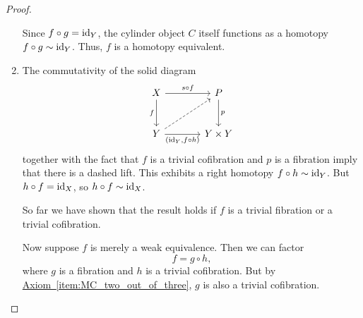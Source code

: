 \documentclass[main.tex]{subfiles}
\begin{document}
\begin{proof}
\begin{enumerate}
      Since $f \circ g = \mathrm{id}_{Y}$, the cylinder object $C$ itself functions as a homotopy $f \circ g \sim \mathrm{id}_{Y}$. Thus, $f$ is a homotopy equivalent.

    \item The commutativity of the solid diagram
      \begin{equation*}
        \begin{tikzcd}[row sep=large, column sep=large]
          X
          \arrow[r, "s \circ f"]
          \arrow[d, swap, "f"]
          & P
          \arrow[d, "p"]
          \\
          Y
          \arrow[r, swap, "{(\id_{Y}, f \circ h)}"]
          \arrow[ur, dashed]
          & Y \times Y
        \end{tikzcd}
      \end{equation*}
      together with the fact that $f$ is a trivial cofibration and $p$ is a fibration imply that there is a dashed lift. This exhibits a right homotopy $f \circ h \sim \mathrm{id}_{Y}$. But $h \circ f = \mathrm{id}_{X}$, so $h \circ f \sim \mathrm{id}_{X}$.

      So far we have shown that the result holds if $f$ is a trivial fibration or a trivial cofibration.

      Now suppose $f$ is merely a weak equivalence. Then we can factor
      \begin{equation*}
        f = g \circ h,
      \end{equation*}
      where $g$ is a fibration and $h$ is a trivial cofibration. But by \hyperref[item:MC_two_out_of_three]{Axiom~\ref*{item:MC_two_out_of_three}}, $g$ is also a trivial cofibration.
  \end{enumerate}
\end{proof}
\end{document}
